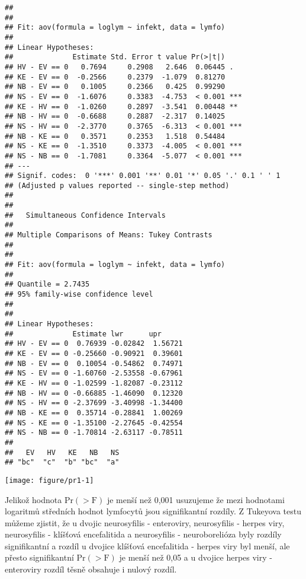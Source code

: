 \documentclass[twoside]{article}\usepackage[]{graphicx}\usepackage[]{color}
\makeatletter
\def\maxwidth{ %
  \ifdim\Gin@nat@width>\linewidth
    \linewidth
  \else
    \Gin@nat@width
  \fi
}
\newenvironment{kframe}{%
 \def\at@end@of@kframe{}%
 \ifinner\ifhmode%
  \def\at@end@of@kframe{\end{minipage}}%
  \begin{minipage}{\columnwidth}%
 \fi\fi%
 \def\FrameCommand##1{\hskip\@totalleftmargin \hskip-\fboxsep
 \colorbox{shadecolor}{##1}\hskip-\fboxsep
     \hskip-\linewidth \hskip-\@totalleftmargin \hskip\columnwidth}%
 \MakeFramed {\advance\hsize-\width
   \@totalleftmargin\z@ \linewidth\hsize
   \@setminipage}}%
 {\par\unskip\endMakeFramed%
 \at@end@of@kframe}
\newenvironment{knitrout}{}{} %
\makeatother
\begin{document}
\begin{knitrout}
\begin{kframe}
\begin{verbatim}
## 
## 
## Fit: aov(formula = loglym ~ infekt, data = lymfo)
## 
## Linear Hypotheses:
##              Estimate Std. Error t value Pr(>|t|)    
## HV - EV == 0   0.7694     0.2908   2.646  0.06445 .  
## KE - EV == 0  -0.2566     0.2379  -1.079  0.81270    
## NB - EV == 0   0.1005     0.2366   0.425  0.99290    
## NS - EV == 0  -1.6076     0.3383  -4.753  < 0.001 ***
## KE - HV == 0  -1.0260     0.2897  -3.541  0.00448 ** 
## NB - HV == 0  -0.6688     0.2887  -2.317  0.14025    
## NS - HV == 0  -2.3770     0.3765  -6.313  < 0.001 ***
## NB - KE == 0   0.3571     0.2353   1.518  0.54484    
## NS - KE == 0  -1.3510     0.3373  -4.005  < 0.001 ***
## NS - NB == 0  -1.7081     0.3364  -5.077  < 0.001 ***
## ---
## Signif. codes:  0 '***' 0.001 '**' 0.01 '*' 0.05 '.' 0.1 ' ' 1
## (Adjusted p values reported -- single-step method)
## 
## 
## 	 Simultaneous Confidence Intervals
## 
## Multiple Comparisons of Means: Tukey Contrasts
## 
## 
## Fit: aov(formula = loglym ~ infekt, data = lymfo)
## 
## Quantile = 2.7435
## 95% family-wise confidence level
##  
## 
## Linear Hypotheses:
##              Estimate lwr      upr     
## HV - EV == 0  0.76939 -0.02842  1.56721
## KE - EV == 0 -0.25660 -0.90921  0.39601
## NB - EV == 0  0.10054 -0.54862  0.74971
## NS - EV == 0 -1.60760 -2.53558 -0.67961
## KE - HV == 0 -1.02599 -1.82087 -0.23112
## NB - HV == 0 -0.66885 -1.46090  0.12320
## NS - HV == 0 -2.37699 -3.40998 -1.34400
## NB - KE == 0  0.35714 -0.28841  1.00269
## NS - KE == 0 -1.35100 -2.27645 -0.42554
## NS - NB == 0 -1.70814 -2.63117 -0.78511
## 
##   EV   HV   KE   NB   NS 
## "bc"  "c"  "b" "bc"  "a"
\end{verbatim}
\end{kframe}
\texttt{[image: figure/pr1-1]} 

\end{knitrout}
Jelikož hodnota $\text{Pr}(>\text{F})$ je menší než 0,001 usuzujeme že mezi hodnotami logaritmů středních hodnot lymfocytů jsou signifikantní rozdíly. Z Tukeyova testu můžeme zjistit, že u dvojic neurosyfilis - enteroviry, neurosyfilis - herpes viry, neurosyfilis - klíšťová encefalitida a neurosyfilis - neuroborelióza byly rozdíly signifikantní a rozdíl u dvojice klíšťová encefalitida - herpes viry byl menší, ale přesto signifikantní $\text{Pr}(>\text{F})$ je menší než 0,05 a u dvojice herpes viry - enteroviry rozdíl těsně obsahuje i nulový rozdíl. 
\end{document}
